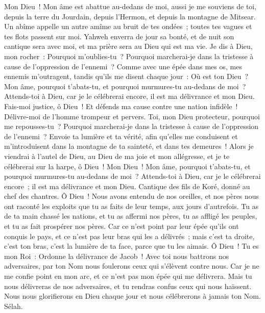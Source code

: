 \begin{multicols}{2}
Mon Dieu~! Mon âme est abattue au-dedans de moi, aussi je me souviens de toi, depuis la terre du Jourdain, depuis l'Hermon, et depuis la montagne de Mitsear.
Un abîme appelle un autre amîme au bruit de tes ondées~; toutes tes vagues et tes flots passent sur moi.
Yahweh enverra de jour sa bonté, et de nuit son cantique sera avec moi, et ma prière sera au Dieu qui est ma vie.
Je dis à Dieu, mon rocher~: Pourquoi m'oublies-tu~? Pourquoi marcherai-je dans la tristesse à cause de l'oppression de l'ennemi~?
Comme avec une épée dans mes os, mes ennemis m'outragent, tandis qu'ils me disent chaque jour~: Où est ton Dieu~?
Mon âme, pourquoi t'abats-tu, et pourquoi murmures-tu au-dedans de moi~? Attends-toi à Dieu, car je le célébrerai encore, il est ma délivrance et mon Dieu.
\VerseOne{}Fais-moi justice, ô Dieu~! Et défends ma cause contre une nation infidèle~! Délivre-moi de l'homme trompeur et pervers.
Toi, mon Dieu protecteur, pourquoi me repousses-tu~? Pourquoi marcherai-je dans la tristesse à cause de l'oppression de l'ennemi~?
Envoie ta lumière et ta vérité, afin qu'elles me conduisent et m'introduisent dans la montagne de ta sainteté, et dans tes demeures~!
Alors je viendrai à l'autel de Dieu, au Dieu de ma joie et mon allégresse, et je te célébrerai sur la harpe, ô Dieu~! Mon Dieu~!
Mon âme, pourquoi t'abats-tu, et pourquoi murmures-tu au-dedans de moi~? Attends-toi à Dieu, car je le célébrerai encore~; il est ma délivrance et mon Dieu.
\VerseOne{}Cantique des fils de Koré, donné au chef des chantres.
Ô Dieu~! Nous avons entendu de nos oreilles, et nos pères nous ont raconté les exploits que tu as faits de leur temps, aux jours d'autrefois.
Tu as de ta main chassé les nations, et tu as affermi nos pères, tu as affligé les peuples, et tu as fait prospérer nos pères.
Car ce n'est point par leur épée qu'ils ont conquis le pays, et ce n'est pas leur bras qui les a délivrés~; mais c'est ta droite, c'est ton bras, c'est la lumière de ta face, parce que tu les aimais.
Ô Dieu~! Tu es mon Roi~: Ordonne la délivrance de Jacob~!
Avec toi nous battrons nos adversaires, par ton Nom nous foulerons ceux qui s'élèvent contre nous.
Car je ne me confie point en mon arc, et ce n'est pas mon épée qui me délivrera.
Mais tu nous délivreras de nos adversaires, et tu rendras confus ceux qui nous haïssent.
Nous nous glorifierons en Dieu chaque jour et nous célébrerons à jamais ton Nom. Sélah.

\end{multicols}
